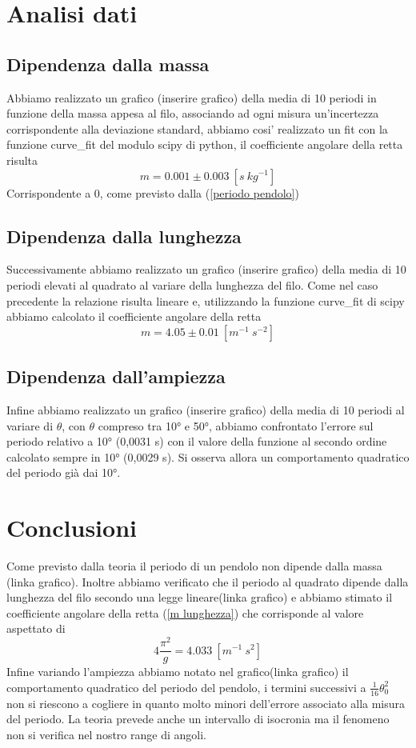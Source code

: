 \documentclass{article}
\begin{document}
	\section{Analisi dati}
		\subsection{Dipendenza dalla massa}
			Abbiamo realizzato un grafico (inserire grafico) della media di 10 periodi in funzione della massa appesa al filo, associando ad ogni misura un'incertezza corrispondente alla deviazione standard, abbiamo cosi' realizzato un fit con la funzione curve\_fit del modulo scipy di python, il coefficiente angolare della retta risulta
			\begin{equation}
				m = 0.001\pm0.003\: [s\:kg^{-1}]
			\end{equation}
			Corrispondente a $0$, come previsto dalla (\ref{periodo pendolo})	
			
		\subsection{Dipendenza dalla lunghezza}
			Successivamente abbiamo realizzato un grafico (inserire grafico) della media di 10 periodi elevati al quadrato al variare della lunghezza del filo. Come nel caso precedente la relazione risulta lineare e, utilizzando la funzione curve\_fit di scipy abbiamo calcolato il coefficiente angolare della retta
			\begin{equation}
				m = 4.05\pm0.01\:[m^{-1}\:s^{-2}]
				\label{m lunghezza}
			\end{equation}
			
		\subsection{Dipendenza dall'ampiezza}	
			Infine abbiamo realizzato un grafico (inserire grafico) della media di 10 periodi al variare di  $\theta$, con $\theta$ compreso tra 10° e 50°, abbiamo confrontato l'errore sul periodo relativo a 10° (0,0031 s) con il valore della funzione al secondo ordine calcolato sempre in 10° (0,0029 s). Si osserva allora un comportamento quadratico del periodo gi\`{a} dai 10°.
	
	\section{Conclusioni}
		Come previsto dalla teoria il periodo di un pendolo non dipende dalla massa (linka grafico). Inoltre abbiamo verificato che il periodo al quadrato dipende dalla lunghezza del filo secondo una legge lineare(linka grafico) e abbiamo stimato il coefficiente angolare della retta (\ref{m lunghezza}) che corrisponde al valore aspettato di
		\begin{equation}
			4\frac{\pi^2}{g}=4.033\:[m^{-1}\:s^2]
		\end{equation}
		Infine variando l'ampiezza abbiamo notato nel grafico(linka grafico) il comportamento quadratico del periodo del pendolo, i termini successivi a $\frac{1}{16}\theta_0^2$ non si riescono a cogliere in quanto molto minori dell'errore associato alla misura del periodo. La teoria prevede anche un intervallo di isocronia ma il fenomeno non si verifica nel nostro range di angoli.
	
\end{document}
